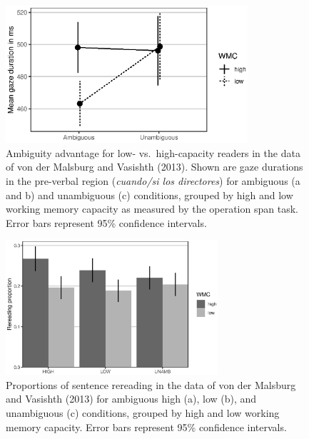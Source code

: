 \documentclass{cambridge7A}\usepackage[]{graphicx}\usepackage[]{color}
\newenvironment{knitrout}{}{} %
\begin{document}
\begin{figure}[!htbp]
  \centering
\begin{knitrout}
\color{fgcolor}

{\centering \includegraphics[width=0.8\textwidth]{figures/fig-mv13dataambadv-1} 

}



\end{knitrout}
%
  \caption[Ambiguity advantage in the pre-verbal region for low-capacity readers in the data of von der Malsburg and Vasishth (2013).]{Ambiguity advantage for low- vs.\ high-capacity readers in the data of von der Malsburg and Vasishth (2013). Shown are gaze durations in the pre-verbal region (\textit{cuando/si los directores}) for ambiguous (a and b) and unambiguous (c) conditions, grouped by high and low working memory capacity as measured by the operation span task.  Error bars represent 95\% confidence intervals.}\label{fig:mv13data:rt}
\end{figure}


\begin{figure}[!htbp]
\centering
%
\begin{knitrout}
\color{fgcolor}

{\centering \includegraphics[width=0.7\textwidth]{figures/fig-mv13datarer-1} 

}



\end{knitrout}
%
  \caption[Proportions of sentence rereading by working memory capacity in the data of von der Malsburg and Vasishth (2013).]{Proportions of sentence rereading in the data of von der Malsburg and Vasishth (2013) for ambiguous high (a), low (b), and unambiguous (c) conditions, grouped by high and low working memory capacity. Error bars represent 95\% confidence intervals.}
  \label{fig:mv13data:rer}
\end{figure}
\end{document}
